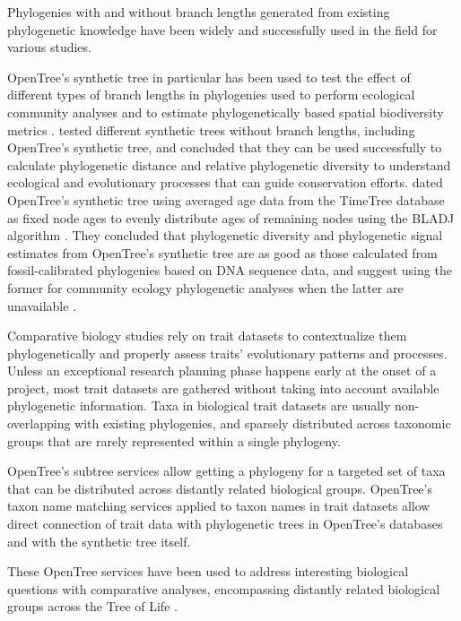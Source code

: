 \documentclass[oupdraft]{sysbio_sse}
\begin{document}
Phylogenies with and without branch lengths generated from
existing phylogenetic knowledge have been widely and successfully used in the field
for various studies.

OpenTree's synthetic tree in particular has been used to test the effect of
different types of branch lengths in phylogenies used to perform ecological community
analyses and to estimate phylogenetically based spatial biodiversity metrics
\citep{allen2019spatial, li2019common}.
\citep{allen2019spatial} tested different synthetic trees without branch lengths,
including OpenTree's synthetic tree, and concluded that they can be used successfully
to calculate phylogenetic distance and relative phylogenetic diversity to understand
ecological and evolutionary processes that can guide conservation efforts.
\citep{li2019common} dated OpenTree's synthetic tree using averaged age data from
the TimeTree database \citep{kumar2017timetree} as fixed node ages to evenly distribute ages of remaining
nodes using the BLADJ algorithm \citep{webb2008phylocom}. They concluded that phylogenetic diversity
and phylogenetic signal estimates from OpenTree's synthetic tree are as good
as those calculated from fossil-calibrated phylogenies based on DNA sequence data,
and suggest using the former for community ecology phylogenetic analyses when the
latter are unavailable \citep{li2019common}.

Comparative biology studies rely on trait datasets to contextualize them phylogenetically
and properly assess traits' evolutionary patterns and processes.
Unless an exceptional research planning phase happens early at the onset of a project,
most trait datasets are gathered without taking into account available phylogenetic information.
Taxa in biological trait datasets are usually non-overlapping with existing phylogenies,
and sparsely distributed across taxonomic groups that are rarely represented within
a single phylogeny.

OpenTree's subtree services allow getting a phylogeny for a targeted set of taxa
that can be distributed across distantly related biological groups.
OpenTree's taxon name matching services applied to taxon names in trait datasets
allow direct connection of trait data with phylogenetic trees in OpenTree's databases
and with the synthetic tree itself.

These OpenTree services have been used to address interesting biological
questions with comparative analyses, encompassing distantly related biological groups across the Tree of Life
\citep{tarka2018sex, healy2019animal, herrera2015predicting, capdevila2020longevity, fisher2017evolution, boeckmann2015quest, uyeda2017evolution}.
\end{document}
